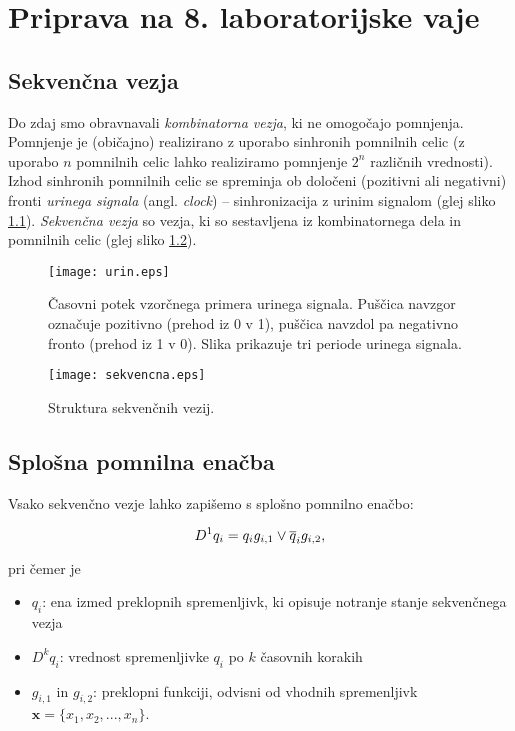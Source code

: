 \chapter{Priprava na 8. laboratorijske vaje}
\section{Sekvenčna vezja}
Do zdaj smo obravnavali \emph{kombinatorna vezja}, ki ne omogočajo pomnjenja. Pomnjenje je (običajno) realizirano z uporabo sinhronih pomnilnih celic (z uporabo $n$ pomnilnih celic lahko realiziramo pomnjenje $2^n$ različnih vrednosti). Izhod sinhronih pomnilnih celic se spreminja ob določeni (pozitivni ali negativni) fronti \emph{urinega signala} (angl. \emph{clock}) -- sinhronizacija z urinim signalom (glej sliko \ref{fig:urin_signal}). \emph{Sekvenčna vezja} so vezja, ki so sestavljena iz kombinatornega dela in pomnilnih celic (glej sliko \ref{fig:sekvencna}). 


\bigskip
\begin{figure}[!ht]
\centering
\texttt{[image: urin.eps]}
\caption{Časovni potek vzorčnega primera urinega signala. Puščica navzgor označuje pozitivno (prehod iz 0 v 1), puščica navzdol pa negativno fronto (prehod iz 1 v 0). Slika prikazuje tri periode urinega signala.}
\label{fig:urin_signal}
\end{figure}

\bigskip
\begin{figure}[!ht]
\centering
\texttt{[image: sekvencna.eps]}
\caption{Struktura sekvenčnih vezij.}
\label{fig:sekvencna}
\end{figure}


\section{Splošna pomnilna enačba}
Vsako sekvenčno vezje lahko zapišemo s splošno pomnilno enačbo:

$$
D^1q_i = q_i g_{i,1} \vee \overline q_i g_{i,2},
$$

pri čemer je
\begin{itemize}
\item $q_i$: ena izmed preklopnih spremenljivk, ki opisuje notranje stanje sekvenčnega vezja
\item $D^k q_i$: vrednost spremenljivke $q_i$ po $k$ časovnih korakih
\item $g_{i,1}$ in $g_{i,2}$: preklopni funkciji, odvisni od vhodnih spremenljivk $\textbf{x}=\{ x_1, x_2, ... , x_n\}$.
\end{itemize}


